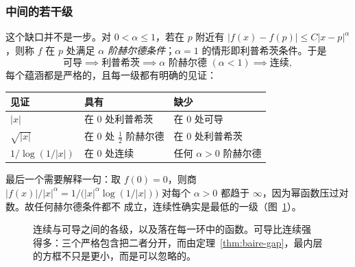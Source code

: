 \subsubsection*{中间的若干级}

这个缺口并不是一步。对 $0<\alpha\le1$，若在 $p$ 附近有
$|f(x)-f(p)| \le C|x-p|^{\alpha}$，则称 $f$ 在 $p$ 处满足
\emph{$\alpha$ 阶赫尔德条件}；$\alpha=1$ 的情形即利普希茨条件。于是
\[ \text{可导} \implies \text{利普希茨} \implies
   \alpha\text{ 阶赫尔德 } (\alpha<1) \implies \text{连续}, \]
每个蕴涵都是严格的，且每一级都有明确的见证：

\begin{center}
\begin{tabular}{@{}lll@{}}
\toprule
\textbf{见证} & \textbf{具有} & \textbf{缺少} \\
\midrule
$|x|$                & 在 $0$ 处利普希茨          & 在 $0$ 处可导 \\
$\sqrt{|x|}$         & 在 $0$ 处 $\tfrac12$ 阶赫尔德 & 在 $0$ 处利普希茨 \\
$1/\log(1/|x|)$      & 在 $0$ 处连续              & 任何 $\alpha>0$ 阶赫尔德 \\
\bottomrule
\end{tabular}
\end{center}

\medskip
最后一个需要解释一句：取 $f(0)=0$，则商
$|f(x)|/|x|^{\alpha} = 1/\bigl(|x|^{\alpha}\log(1/|x|)\bigr)$ 对每个
$\alpha>0$ 都趋于 $\infty$，因为幂函数压过对数。故任何赫尔德条件都不
成立，连续性确实是最低的一级（图~\ref{fig:rungs}）。

\begin{figure}[htbp]
\centering
{}
\caption{连续与可导之间的各级，以及落在每一环中的函数。可导比连续强
得多：三个严格包含把二者分开，而由定理~\ref{thm:baire-gap}，最内层
的方框不只是更小，而是可以忽略的。}
\label{fig:rungs}
\end{figure}

